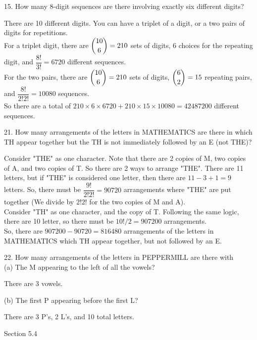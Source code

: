 \documentclass[12pt]{article}
\begin{document}
15. How many 8-digit sequences are there involving exactly six 
different digits?
\begin{solution}
    There are 10 different digits. You can have a triplet of a digit, or 
    a two pairs of digits for repetitions. \\
    For a triplet digit, 
    there are $\dbinom{10}{6} = 210$ sets of digits, 
    6 choices for the repeating digit,  
    and $\dfrac{8!}{3!}=6720$ different sequences.\\
    For the two pairs, 
    there are $\dbinom{10}{6} = 210$ sets of digits, 
    $\dbinom{6}{2}=15$ repeating pairs,  
    and $\dfrac{8!}{2!2!}=10080$ sequences. \\
    So there are a total of $210\times6\times6720 + 210\times15\times10080
    = 42487200$
    different sequences. 
\end{solution}
21. How many arrangements of the letters in MATHEMATICS are there in which
TH appear together but the TH is not immediately followed by an E (not THE)?
\begin{solution}
    Consider "THE" as one character. Note that there are 2 copies of M, 
    two copies of A, and two copies of T. 
    So there are 2 ways to arrange "THE". There are 11 letters, but if 
    "THE" is considered one letter, then there are $11-3+1=9$ letters. 
    So, there must be $\dfrac{9!}{2!2!} = 90720$ arrangements where "THE"
    are put 
    together (We divide by $2!2!$ for the two copies of M and A). \\
    Consider "TH" as one character, and the copy of T. Following the same
    logic, there are 10 letter, so there must be $10!/2 = 907200$ 
    arrangements. \\
    So, there are $907200-90720=816480$ arrangements of the letters in MATHEMATICS 
    which TH appear together, but not followed by an E. 
\end{solution}
22. How many arrangements of the letters in PEPPERMILL are there with \\
(a) The M appearing to the left of all the vowels?
\begin{solution}
    There are 3 vowels. 
\end{solution}
(b) The first P appearing before the first L?
\begin{solution}
    There are 3 P's, 2 L's, and 10 total letters. \\
    
\end{solution}
Section 5.4 \\
\end{document}
